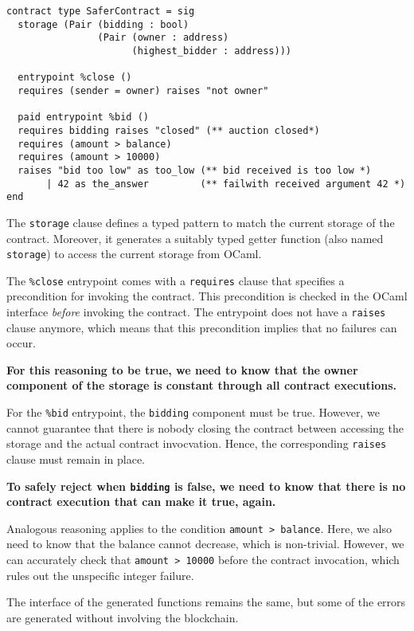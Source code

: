\documentclass[a4paper]{llncs}
\begin{document}
\begin{lstlisting}[caption={Safer contract module},label={lst:safer-contract-module}]
contract type SaferContract = sig
  storage (Pair (bidding : bool) 
                (Pair (owner : address) 
                      (highest_bidder : address)))

  entrypoint %close ()
  requires (sender = owner) raises "not owner"

  paid entrypoint %bid () 
  requires bidding raises "closed" (** auction closed*)
  requires (amount > balance)
  requires (amount > 10000)
  raises "bid too low" as too_low (** bid received is too low *)
       | 42 as the_answer         (** failwith received argument 42 *)
end
\end{lstlisting}
The \lstinline/storage/ clause defines a typed pattern to match the
current storage of the contract. Moreover, it generates a suitably
typed getter function (also named \lstinline/storage/) 
to access the current storage from OCaml. 

The \lstinline/%close/ entrypoint comes with a \lstinline/requires/
clause that specifies a precondition for invoking the contract. This
precondition is checked in the OCaml interface \emph{before} invoking
the contract. The entrypoint does not have a \lstinline/raises/
clause anymore, which means that this precondition implies that no
failures can occur.

\textbf{For this reasoning to be true, we need to know that the owner
  component of the storage is constant through all contract executions.}

For the \lstinline/%bid/ entrypoint, the \lstinline/bidding/ component
must be true. However, we cannot guarantee that there is nobody
closing the contract between accessing the storage and the
actual contract invocvation. Hence, the corresponding
\lstinline/raises/ clause must remain in place.

\textbf{To safely reject when \lstinline/bidding/ is false, we need to know
  that there is no contract execution that can make it true, again.}

Analogous reasoning applies to the condition
\lstinline/amount > balance/. Here, we also need to know that the
balance cannot decrease, which is non-trivial. However, we can accurately check that
\lstinline/amount > 10000/ before the contract invocation, which rules
out the unspecific integer failure.

The interface of the generated functions remains the same, but some of
the errors are generated without involving the blockchain.
\end{document}
